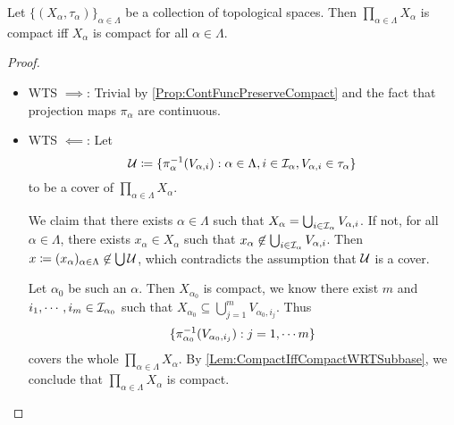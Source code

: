 \documentclass[screen,single]{techreport}
\numberwithin{equation}{section}
\begin{document}
\begin{theorem}\label{The:Tikhonov}
	Let $\{(X_\alpha,\tau_\alpha)\}_{\alpha \in \Lambda}$ be a collection of topological spaces.
	Then $\prod_{\alpha \in \Lambda} X_\alpha$ is compact iff $X_\alpha$ is compact for all $\alpha \in \Lambda$.
\end{theorem}
\begin{proof}\
	\begin{itemize}
		\item WTS $\implies$: Trivial by \cref{Prop:ContFuncPreserveCompact} and the fact that projection maps $\pi_\alpha$ are continuous.
		\item WTS $\impliedby$: Let
		\[
		\mathcal{U} \coloneqq \{ { \pi_\alpha^{-1}(V_{\alpha,i}) : \alpha \in \Lambda, i \in \mathcal{I}_\alpha, V_{\alpha,i} \in \tau_\alpha  } \}
		\]
		to be a cover of $\prod_{\alpha \in \Lambda} X_\alpha$.
		
		We claim that there exists $\alpha \in \Lambda$ such that $X_\alpha = \bigcup_{i \in \mathcal{I}_\alpha} V_{\alpha,i}$.
		If not, for all $\alpha \in \Lambda$, there exists $x_\alpha \in X_\alpha$ such that $x_\alpha \not\in \bigcup_{i \in \mathcal{I}_\alpha} V_{\alpha,i}$.
		Then $x \coloneqq (x_\alpha)_{\alpha \in \Lambda} \not\in \bigcup \mathcal{U}$, which contradicts the assumption that $\mathcal{U}$ is a cover.
		
		Let $\alpha_0$ be such an $\alpha$.
		Then $X_{\alpha_0}$ is compact, we know there exist $m$ and $i_1,\cdots,i_m \in \mathcal{I}_{\alpha_0}$ such that $X_{\alpha_0} \subseteq \bigcup_{j=1}^m V_{\alpha_0,i_j}$.
		Thus
		\[
		\{ { \pi_{\alpha_0}^{-1}(V_{\alpha_0, i_j}) : j = 1,\cdots m } \}
		\]
		covers the whole $\prod_{\alpha \in \Lambda} X_\alpha$.
		By \cref{Lem:CompactIffCompactWRTSubbase}, we conclude that $\prod_{\alpha \in \Lambda} X_\alpha$ is compact.
	\end{itemize}
\end{proof}
\end{document}
